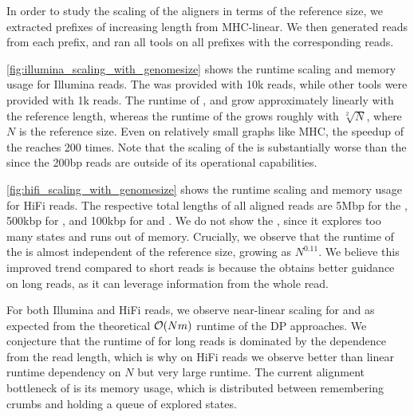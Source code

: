 In order to study the scaling of the aligners in terms of the reference size, we
extracted prefixes of increasing length from MHC-linear. We then generated reads
from each prefix, and ran all tools on all prefixes with the corresponding
reads.

\cref{fig:illumina_scaling_with_genomesize} shows the runtime scaling and memory
usage for Illumina reads. The \seedh was provided with 10k reads, while other
tools were provided with 1k reads.
%
The runtime of \graphaligner, \pasgal and \vargas grow approximately linearly
with the reference length, whereas the runtime of the \seedh grows roughly with
$\sqrt[2]{N}$, where $N$ is the reference size. Even on relatively small graphs
like MHC, the speedup of the \seedh reaches 200 times. Note that the scaling of
the \prefixh is substantially worse than the \seedh since the 200bp reads are
outside of its operational capabilities.

\cref{fig:hifi_scaling_with_genomesize} shows the runtime scaling and memory
usage for HiFi reads. The respective total lengths of all aligned reads are 5Mbp
for the \seedh, 500kbp for \graphaligner, and 100kbp for \vargas and \pasgal. We
do not show the \prefixh, since it explores too many states and runs out of
memory.
%
Crucially, we observe that the runtime of the \seedh is almost independent of
the reference size, growing as $N^{0.11}$. We believe this improved trend
compared to short reads is because the \seedh obtains better guidance on long
reads, as it can leverage information from the whole read.

For both Illumina and HiFi reads, we observe near-linear scaling for \pasgal and
\graphaligner as expected from the theoretical $\mathcal{O}(Nm)$ runtime of the DP
approaches. We conjecture that the runtime of \vargas for long reads is
dominated by the dependence from the read length, which is why on HiFi reads we
observe better than linear runtime dependency on $N$ but very large runtime. The
current alignment bottleneck of \astarixseeds is its memory usage, which is
distributed between remembering crumbs and holding a queue of explored states.